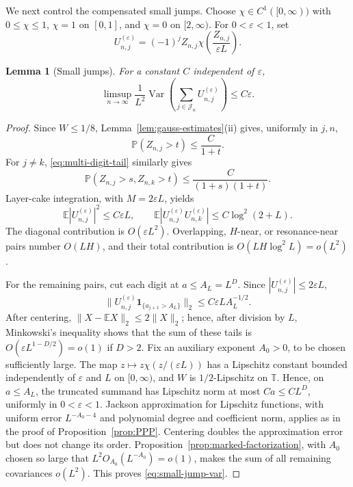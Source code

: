\documentclass[11pt,a4paper]{amsart}
\newtheorem{lemma}[theorem]{Lemma}
\theoremstyle{definition}
\theoremstyle{remark}
\newcommand{\T}{\mathbb T}
\newcommand{\E}{\mathbb E}
\newcommand{\Pp}{\mathbb P}
\newcommand{\ind}{\mathbf 1}
\newcommand{\Var}{\operatorname{Var}}
\begin{document}
We next control the compensated small jumps.  Choose
$\chi\in C^1([0,\infty))$ with $0\le\chi\le1$, $\chi=1$ on $[0,1]$, and
$\chi=0$ on $[2,\infty)$.  For $0<\varepsilon<1$, set
\begin{equation}\label{eq:small-jump-U}
 U_{n,j}^{(\varepsilon)}=(-1)^jZ_{n,j}
 \chi\!\left(\frac{Z_{n,j}}{\varepsilon L}\right).
\end{equation}

\begin{lemma}[Small jumps]\label{lem:small-jumps}
For a constant $C$ independent of $\varepsilon$,
\begin{equation}\label{eq:small-jump-var}
 \limsup_{n\to\infty}\frac1{L^2}
 \Var\left(\sum_{j\in\mathcal J_n}U_{n,j}^{(\varepsilon)}\right)
 \le C\varepsilon.
\end{equation}
\end{lemma}

\begin{proof}
Since $W\le1/8$, Lemma~\ref{lem:gauss-estimates}(ii) gives, uniformly in
$j,n$,
\[
 \Pp(Z_{n,j}>t)\le\frac{C}{1+t}.
\]
For $j\ne k$, \eqref{eq:multi-digit-tail} similarly gives
\[
 \Pp(Z_{n,j}>s,Z_{n,k}>t)
 \le\frac{C}{(1+s)(1+t)}.
\]
Layer-cake integration, with $M=2\varepsilon L$, yields
\begin{equation}\label{eq:small-moments}
 \E|U_{n,j}^{(\varepsilon)}|^2\le C\varepsilon L,
 \qquad
 \E|U_{n,j}^{(\varepsilon)}U_{n,k}^{(\varepsilon)}|
 \le C\log^2(2+L).
\end{equation}
The diagonal contribution is $O(\varepsilon L^2)$.  Overlapping,
$H$-near, or resonance-near pairs number $O(LH)$, and their total
contribution is $O(LH\log^2L)=o(L^2)$.

For the remaining pairs, cut each digit at $a\le A_L=L^D$.  Since
$|U_{n,j}^{(\varepsilon)}|\le2\varepsilon L$,
\[
 \|U_{n,j}^{(\varepsilon)}\ind_{\{a_{j+1}>A_L\}}\|_2
 \le C\varepsilon L A_L^{-1/2}.
\]
After centering, $\|X-\E X\|_2\le2\|X\|_2$; hence, after division by $L$,
Minkowski's inequality shows that the sum of these tails is
$O(\varepsilon L^{1-D/2})=o(1)$ if $D>2$.  Fix an auxiliary exponent
$A_0>0$, to be chosen sufficiently large.  The map
$z\mapsto z\chi(z/(\varepsilon L))$ has a Lipschitz constant bounded
independently of $\varepsilon$ and $L$ on
$[0,\infty)$, and $W$ is $1/2$-Lipschitz on $\T$.  Hence, on $a\le A_L$,
the truncated summand has Lipschitz norm at most $Ca\le CL^D$, uniformly in
$0<\varepsilon<1$.  Jackson approximation for Lipschitz functions, with
uniform error $L^{-A_0-4}$ and polynomial degree and coefficient norm, applies
as in the proof of Proposition~\ref{prop:PPP}.
Centering doubles the approximation error but does not change its order.
Proposition~\ref{prop:marked-factorization},
with $A_0$ chosen so large that $L^2O_{A_0}(L^{-A_0})=o(1)$, makes the sum of all
remaining covariances $o(L^2)$.  This proves
\eqref{eq:small-jump-var}.
\end{proof}
\end{document}
